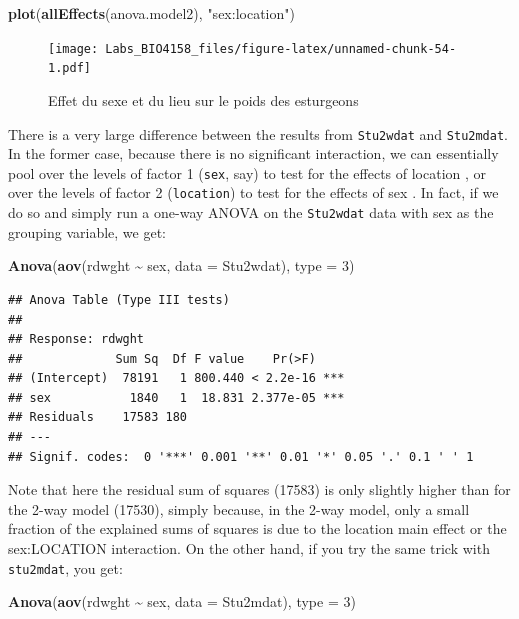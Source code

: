 \documentclass[
  12pt,
]{book}
\newenvironment{Shaded}{\begin{snugshade}}{\end{snugshade}}
\newcommand{\DataTypeTok}[1]{\textcolor[rgb]{0.13,0.29,0.53}{#1}}
\newcommand{\DecValTok}[1]{\textcolor[rgb]{0.00,0.00,0.81}{#1}}
\newcommand{\KeywordTok}[1]{\textcolor[rgb]{0.13,0.29,0.53}{\textbf{#1}}}
\newcommand{\NormalTok}[1]{#1}
\newcommand{\OperatorTok}[1]{\textcolor[rgb]{0.81,0.36,0.00}{\textbf{#1}}}
\newcommand{\StringTok}[1]{\textcolor[rgb]{0.31,0.60,0.02}{#1}}
\begin{document}
\begin{Shaded}
\begin{Highlighting}[]
\KeywordTok{plot}\NormalTok{(}\KeywordTok{allEffects}\NormalTok{(anova.model2), }\StringTok{"sex:location"}\NormalTok{)}
\end{Highlighting}
\end{Shaded}

\begin{figure}
\centering
\texttt{[image: Labs\_BIO4158\_files/figure-latex/unnamed-chunk-54-1.pdf]}
\caption{\label{fig:unnamed-chunk-54}Effet du sexe et du lieu sur le poids des esturgeons}
\end{figure}

There is a very large difference between the results from \texttt{Stu2wdat} and \texttt{Stu2mdat}. In the former case, because there is no significant interaction, we can essentially pool over the levels of factor 1 (\texttt{sex}, say) to test for the effects of location , or over the levels of factor 2 (\texttt{location}) to test for the effects of sex . In fact, if we do so and simply run a one-way ANOVA on the \texttt{Stu2wdat} data with sex as the grouping variable, we get:

\begin{Shaded}
\begin{Highlighting}[]
\KeywordTok{Anova}\NormalTok{(}\KeywordTok{aov}\NormalTok{(rdwght }\OperatorTok{\textasciitilde{}}\StringTok{ }\NormalTok{sex, }\DataTypeTok{data =}\NormalTok{ Stu2wdat), }\DataTypeTok{type =} \DecValTok{3}\NormalTok{)}
\end{Highlighting}
\end{Shaded}

\begin{verbatim}
## Anova Table (Type III tests)
## 
## Response: rdwght
##             Sum Sq  Df F value    Pr(>F)    
## (Intercept)  78191   1 800.440 < 2.2e-16 ***
## sex           1840   1  18.831 2.377e-05 ***
## Residuals    17583 180                      
## ---
## Signif. codes:  0 '***' 0.001 '**' 0.01 '*' 0.05 '.' 0.1 ' ' 1
\end{verbatim}

Note that here the residual sum of squares (17583) is only slightly higher than for the 2-way model (17530), simply because, in the 2-way model, only a small fraction of the explained sums of squares is due to the location main effect or the sex:LOCATION interaction. On the other hand, if you try the same trick with \texttt{stu2mdat}, you get:

\begin{Shaded}
\begin{Highlighting}[]
\KeywordTok{Anova}\NormalTok{(}\KeywordTok{aov}\NormalTok{(rdwght }\OperatorTok{\textasciitilde{}}\StringTok{ }\NormalTok{sex, }\DataTypeTok{data =}\NormalTok{ Stu2mdat), }\DataTypeTok{type =} \DecValTok{3}\NormalTok{)}
\end{Highlighting}
\end{Shaded}
\end{document}

